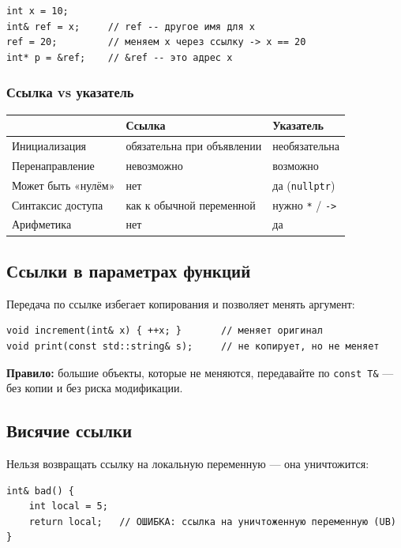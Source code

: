 \begin{lstlisting}
int x = 10;
int& ref = x;     // ref -- другое имя для x
ref = 20;         // меняем x через ссылку -> x == 20
int* p = &ref;    // &ref -- это адрес x
\end{lstlisting}

\subsubsection{Ссылка vs указатель}

\begin{center}
\begin{tabular}{lp{4.5cm}p{4.5cm}}
\toprule
& \textbf{Ссылка} & \textbf{Указатель} \\
\midrule
Инициализация & обязательна при объявлении & необязательна \\
\addlinespace
Перенаправление & невозможно & возможно \\
\addlinespace
Может быть «нулём» & нет & да (\texttt{nullptr}) \\
\addlinespace
Синтаксис доступа & как к обычной переменной & нужно \texttt{*} / \texttt{->} \\
\addlinespace
Арифметика & нет & да \\
\bottomrule
\end{tabular}
\end{center}

\subsection{Ссылки в параметрах функций}

Передача по ссылке избегает копирования и позволяет менять аргумент:

\begin{lstlisting}
void increment(int& x) { ++x; }       // меняет оригинал
void print(const std::string& s);     // не копирует, но не меняет
\end{lstlisting}

\textbf{Правило:} большие объекты, которые не меняются, передавайте по
\texttt{const T\&} --- без копии и без риска модификации.

\subsection{Висячие ссылки}

Нельзя возвращать ссылку на локальную переменную --- она уничтожится:

\begin{lstlisting}
int& bad() {
    int local = 5;
    return local;   // ОШИБКА: ссылка на уничтоженную переменную (UB)
}
\end{lstlisting}

